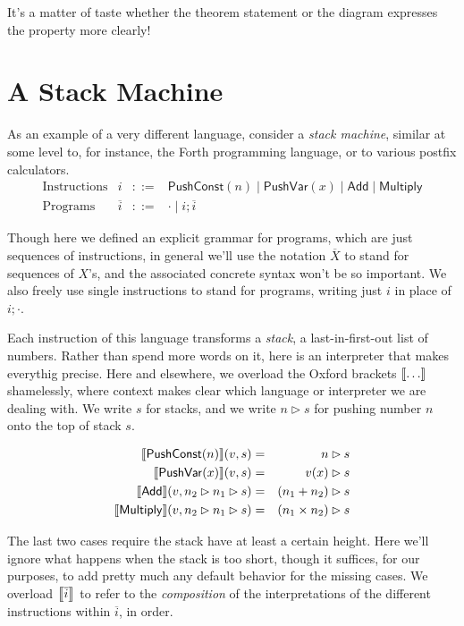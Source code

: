 \documentclass{amsbook}
\theoremstyle{definition}
\theoremstyle{remark}
\numberwithin{section}{chapter}
\numberwithin{equation}{chapter}
\begin{document}
It's a matter of taste whether the theorem statement or the diagram expresses the property more clearly!

\section{A Stack Machine}

As an example of a very different language, consider a \emph{stack machine}, similar at some level to, for instance, the Forth programming language, or to various postfix calculators.
\encoding
$$\begin{array}{rrcl}
  \textrm{Instructions} & i &::=& \mathsf{PushConst}(n) \mid \mathsf{PushVar}(x) \mid \mathsf{Add} \mid \mathsf{Multiply} \\
  \textrm{Programs} & \overline{i} &::=& \cdot \mid i; \overline{i}
\end{array}$$

Though here we defined an explicit grammar for programs, which are just sequences of instructions, in general we'll use the notation $\overline{X}$ to stand for sequences of $X$'s, and the associated concrete syntax won't be so important.
We also freely use single instructions to stand for programs, writing just $i$ in place of $i; \cdot$.

\newcommand{\push}[2]{#1 \rhd #2}

Each instruction of this language transforms a \emph{stack}, a last-in-first-out list of numbers.
Rather than spend more words on it, here is an interpreter that makes everythig precise.
Here and elsewhere, we overload the Oxford brackets ${\left \llbracket \ldots \right \rrbracket}$ shamelessly, where context makes clear which language or interpreter we are dealing with.
We write $s$ for stacks, and we write $\push{n}{s}$ for pushing number $n$ onto the top of stack $s$.

\encoding
\begin{eqnarray*}
  \denote{\mathsf{PushConst}(n)}(v,s) &=& \push{n}{s} \\
  \denote{\mathsf{PushVar}(x)}(v,s) &=& \push{\msel{v}{x}}{s} \\
  \denote{\mathsf{Add}}(v,\push{n_2}{\push{n_1}{s}}) &=& \push{(n_1 + n_2)}{s} \\
  \denote{\mathsf{Multiply}}(v,\push{n_2}{\push{n_1}{s}}) &=& \push{(n_1 \times n_2)}{s}
\end{eqnarray*}

The last two cases require the stack have at least a certain height.
Here we'll ignore what happens when the stack is too short, though it suffices, for our purposes, to add pretty much any default behavior for the missing cases.
We overload ${\left \llbracket \overline{i} \right \rrbracket}$ to refer to the \emph{composition} of the interpretations of the different instructions within $\overline{i}$, in order.
\end{document}
